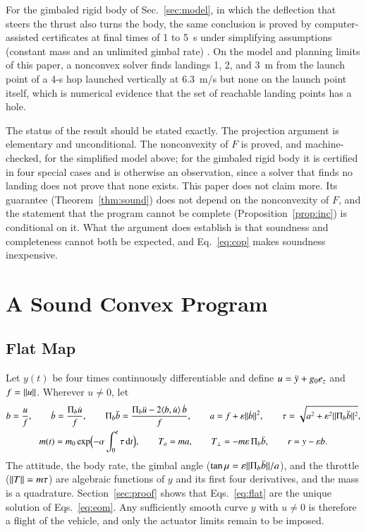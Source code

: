 For the gimbaled rigid body of Sec.~\ref{sec:model}, in which the deflection that steers the thrust also turns the body, the
same conclusion is proved by computer-assisted certificates at final times of 1 to 5~s under simplifying assumptions
(constant mass and an unlimited gimbal rate) \cite{repo}. On the model and planning limits of this paper, a nonconvex solver
\cite{ipopt} finds landings 1, 2, and 3~m from the launch point of a 4-s hop launched vertically at 6.3~m/s but none on the
launch point itself, which is numerical evidence that the set of reachable landing points has a hole.

The status of the result should be stated exactly. The projection argument is elementary and unconditional. The
nonconvexity of $F$ is proved, and machine-checked, for the simplified model above; for the gimbaled rigid body it is certified
in four special cases and is otherwise an observation, since a solver that finds no landing does not prove that none exists.
This paper does not claim more. Its guarantee (Theorem~\ref{thm:sound}) does not depend on the nonconvexity of $F$, and the
statement that the program cannot be complete (Proposition~\ref{prop:inc}) is conditional on it. What the argument does
establish is that soundness and completeness cannot both be expected, and Eq.~\eqref{eq:cop} makes soundness inexpensive.

\section{A Sound Convex Program}\label{sec:program}
\subsection{Flat Map}
Let $y(t)$ be four times continuously differentiable and define $u=\ddot y+g_0e_z$ and $f=\lVert u\rVert$. Wherever $u\ne0$, let
\begin{equation}\label{eq:flat}
\begin{gathered}
b=\frac uf,\qquad \dot b=\frac{\Pi_b\dot u}{f},\qquad \Pi_b\ddot b=\frac{\Pi_b\ddot u-2\langle b,\dot u\rangle\,\dot b}{f},\qquad
a=f+\varepsilon\lVert \dot b\rVert^2,\qquad \tau=\sqrt{a^2+\varepsilon^2\lVert \Pi_b\ddot b\rVert^2},\\
m(t)=m_0\exp\Bigl(-\alpha\int_0^t\tau\,\mathrm dt\Bigr),\qquad T_a=ma,\qquad T_\perp=-m\varepsilon\,\Pi_b\ddot b,\qquad r=y-\varepsilon b .
\end{gathered}
\end{equation}
The attitude, the body rate, the gimbal angle ($\tan\mu=\varepsilon\lVert \Pi_b\ddot b\rVert/a$), and the throttle ($\lVert T\rVert=m\tau$) are
algebraic functions of $y$ and its first four derivatives, and the mass is a quadrature. Section~\ref{sec:proof} shows that
Eqs.~\eqref{eq:flat} are the unique solution of Eqs.~\eqref{eq:eom}. Any sufficiently smooth curve $y$ with $u\ne0$ is
therefore a flight of the vehicle, and only the actuator limits remain to be imposed.

